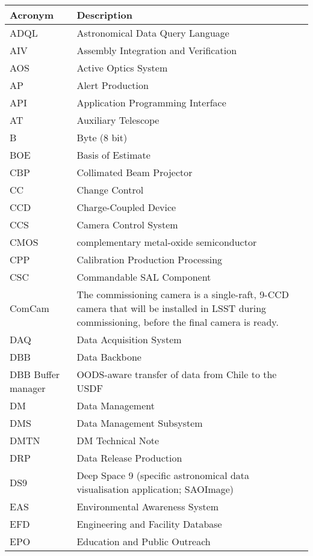 \addtocounter{table}{-1}
\begin{longtable}{p{}p{}}\hline
\textbf{Acronym} & \textbf{Description}  \\\hline

ADQL & Astronomical Data Query Language \\\hline
AIV & Assembly Integration and Verification \\\hline
AOS & Active Optics System \\\hline
AP & Alert Production \\\hline
API & Application Programming Interface \\\hline
AT & Auxiliary Telescope \\\hline
B & Byte (8 bit) \\\hline
BOE & Basis of Estimate \\\hline
CBP & Collimated Beam Projector \\\hline
CC & Change Control \\\hline
CCD & Charge-Coupled Device \\\hline
CCS & Camera Control System \\\hline
CMOS & complementary metal-oxide semiconductor \\\hline
CPP & Calibration Production Processing \\\hline
CSC & Commandable SAL Component \\\hline
ComCam & The commissioning camera is a single-raft, 9-CCD camera that will be installed in LSST during commissioning, before the final camera is ready. \\\hline
DAQ & Data Acquisition System \\\hline
DBB & Data Backbone \\\hline
DBB Buffer manager & OODS-aware transfer of data from Chile to the USDF \\\hline
DM & Data Management \\\hline
DMS & Data Management Subsystem \\\hline
DMTN & DM Technical Note \\\hline
DRP & Data Release Production \\\hline
DS9 & Deep Space 9 (specific astronomical data visualisation application; SAOImage) \\\hline
EAS & Environmental Awareness System \\\hline
EFD & Engineering and Facility Database \\\hline
EPO & Education and Public Outreach \\\hline

\end{longtable}
